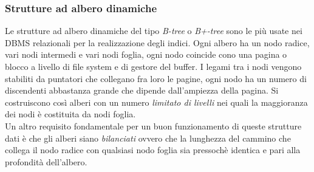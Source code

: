 \subsubsection{Strutture ad albero dinamiche}
Le strutture ad albero dinamiche del tipo \emph{B-tree} o \emph{B+-tree} sono le più usate nei DBMS relazionali per la realizzazione degli indici. Ogni albero ha un nodo radice, vari nodi intermedi e vari nodi foglia, ogni nodo coincide cono una pagina o blocco a livello di file system e di gestore del buffer. I legami tra i nodi vengono stabiliti da puntatori che collegano fra loro le pagine, ogni nodo ha un numero di discendenti abbastanza grande che dipende dall'ampiezza della pagina. Si costruiscono così alberi con un numero \emph{limitato di livelli} nei quali la maggioranza dei nodi è costituita da nodi foglia.\\
Un altro requisito fondamentale per un  buon funzionamento di queste strutture dati è che gli alberi siano \emph{bilanciati} ovvero che la lunghezza del cammino che collega il nodo radice con qualsiasi nodo foglia sia pressochè identica e pari alla profondità dell'albero.\\
